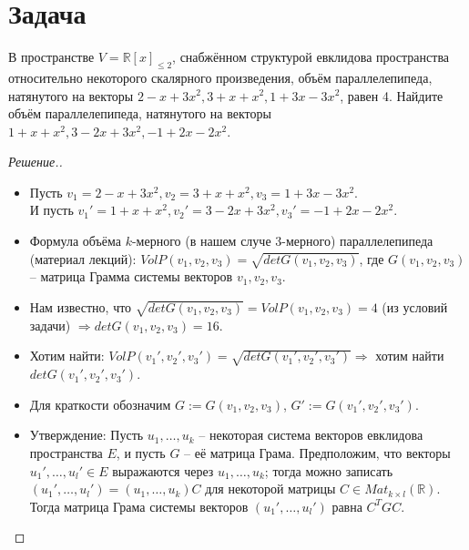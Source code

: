 \documentclass[a4paper]{article}
\theoremstyle{remark}
\begin{document}
    \section*{Задача }
        В пространстве $V = \mathbb{R}[x]_{\leqslant 2}$, снабжённом структурой евклидова пространства
        относительно некоторого скалярного произведения, объём параллелепипеда, натянутого на векторы
        $2 - x + 3x^2, 3 + x + x^2, 1 + 3x - 3x^2$, равен 4. Найдите объём параллелепипеда, натянутого
        на векторы $1 + x + x^2, 3 - 2x + 3x^2, -1 + 2x - 2x^2$. 
         \begin{proof}[Решение.] \ 
          \begin{itemize}
              \item Пусть $v_1 = 2 - x + 3x^2, v_2 = 3 + x + x^2, v_3 = 1 + 3x - 3x^2$. \\
              И пусть $v_1' = 1 + x + x^2, v_2' = 3 - 2x + 3x^2, v_3' = -1 + 2x - 2x^2$.
              \item Формула объёма $k$-мерного (в нашем случе 3-мерного) параллелепипеда (материал
              лекций): $VolP(v_1, v_2, v_3) = \sqrt{detG(v_1, v_2, v_3)}$, где $G(v_1, v_2, v_3)$ --
              матрица Грамма системы векторов $v_1, v_2, v_3$.
              \item Нам известно, что $\sqrt{detG(v_1, v_2, v_3)} = VolP(v_1, v_2, v_3) = 4$ (из
              условий задачи) $\Rightarrow detG(v_1, v_2, v_3) = 16$. 
              \item Хотим найти: $VolP(v_1', v_2', v_3') = \sqrt{detG(v_1', v_2', v_3')} \Rightarrow$
              хотим найти $detG(v_1', v_2', v_3')$.
              \item Для краткости обозначим $G := G(v_1, v_2, v_3)$, $G' := G(v_1', v_2', v_3')$.
              \item Утверждение: Пусть $u_1, \ldots, u_k$ -- некоторая система векторов 
              евклидова пространства $E$, и пусть $G$ -- её матрица Грама. Предположим, что
              векторы $u_1', \ldots, u_l' \in E$ выражаются через $u_1, \ldots, u_k$; тогда
              можно записать $(u_1', \ldots, u_l') = (u_1, \ldots, u_k)C$ для некоторой матрицы
              $C \in Mat_{k \times l}(\mathbb{R})$. Тогда матрица Грама системы векторов
              $(u_1', \ldots, u_l')$ равна $C^TGC$. \\
              

\end{itemize}
\end{proof}
\end{document}
